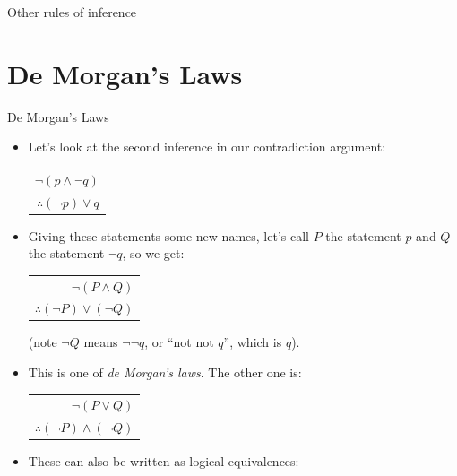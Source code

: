 \documentclass[12pt,aspectratio=1610, handout]{beamer}
\begin{document}
\begin{frame}{Other rules of inference}
\vspace{5mm}



		

	
	

\end{frame}




\section{De Morgan's Laws}
\begin{frame}{De Morgan's Laws}
	\begin{itemize}
		\item Let's look at the second inference in our contradiction argument: 
		\begin{center}
			\begin{tabular}{r}
				$\neg(p  \wedge \neg q)$ \\
				$\therefore (\neg p) \vee q$
			\end{tabular}
		\end{center}
		\item Giving these statements some new names, let's call $P$ the statement $p$ and $Q$ the statement $\neg q$, so we get: 
		\begin{center}
			\begin{tabular}{r}
				$\neg(P  \wedge Q)$ \\
				$\therefore (\neg P) \vee (\neg Q)$
			\end{tabular}
		\end{center}
		(note $\neg Q$ means $\neg \neg q$, or ``not not $q$'', which is $q$). 
		\item This is one of \emph{de Morgan's laws}. The other one is: 
		\begin{center}
			\begin{tabular}{r}
				$\neg(P  \vee Q)$ \\
				$\therefore (\neg P) \wedge (\neg Q)$
			\end{tabular}
		\end{center}
		
		\setlength{\abovedisplayskip}{0pt}
		\item[\finger] These can also be written as logical equivalences:
		\begin{center}		
			\end{center}
		
	\end{itemize}
\end{frame}
\end{document}
